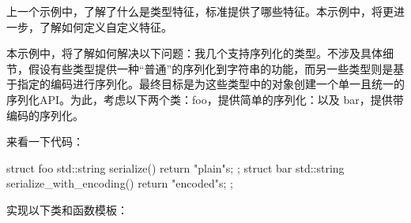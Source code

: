 
上一个示例中，了解了什么是类型特征，标准提供了哪些特征。本示例中，将更进一步，了解如何定义自定义特征。


本示例中，将了解如何解决以下问题：我几个支持序列化的类型。不涉及具体细节，假设有些类型提供一种“普通”的序列化到字符串的功能，而另一些类型则是基于指定的编码进行序列化。最终目标是为这些类型中的对象创建一个单一且统一的序列化API。为此，考虑以下两个类：foo，提供简单的序列化：以及 bar，提供带编码的序列化。

来看一下代码：

\begin{cpp}
struct foo
{
    std::string serialize()
    {
        return "plain"s;
    }
};
struct bar
{
    std::string serialize_with_encoding()
    {
        return "encoded"s;
    }
};
\end{cpp}


实现以下类和函数模板：

